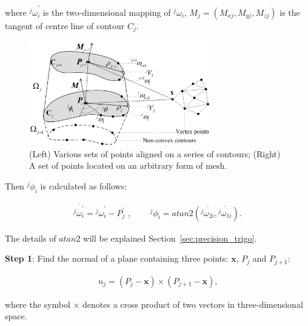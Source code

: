 where ${^j\omega}^{\prime}_i$ is the two-dimensional mapping of $^j\omega_i$, $M_j=(M_{xj}, M_{yj}, M_{zj})$ is the tangent of centre line of contour $C_j$.

\begin{figure}[ht]
\begin{center}
\includegraphics[width=0.7\textwidth]{3_precision/figures/pqa}
\end{center}
\caption[Various sets of points aligned on a series of contours; A set of points located on an arbitrary form of mesh.]{(Left) Various sets of points aligned on a series of contours; 
(Right) A set of points located on an arbitrary form of mesh.}
\label{fig:pqa_ch3}
\end{figure}

Then ${^j\phi_i}$ is calculated as follows:

\begin{equation}
\begin{aligned}
\overline{{^j\omega}^{\prime}_i} = {^j\omega}^{\prime}_i - P^{\prime}_j \mbox{ , } \qquad
{^j\phi}_i = atan2 \left ( \overline{{^j\omega}_{2i}},\overline{{^j\omega}_{1i}} \right ) \mbox{.}
\end{aligned}
\label{eqt:preprocess2}
\end{equation}

The details of $atan2$ will be explained Section~\ref{sec:precision_trigo}.

\noindent \textbf{Step 1}:
Find the normal of a plane containing three points: $\textbf{x}$, $P_j$ and $P_{j+1}$:

\begin{equation}
\begin{aligned}
n_j = \left ( P_j-\textbf{x} \right ) \times \left ( P_{j+1}-\textbf{x} \right ) \mbox{,}
\end{aligned}
\label{eqt:normal}
\end{equation}

where the symbol $\times$ denotes a cross product of two vectors in three-dimensional space.

